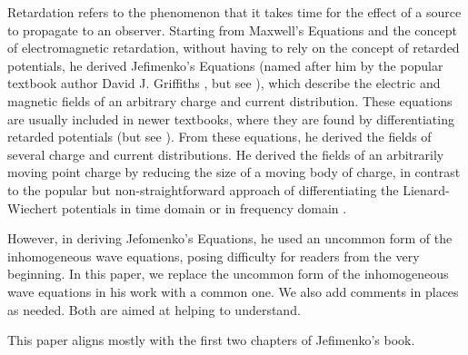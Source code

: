 \documentclass[11pt]{article}              %
\begin{document}
Retardation refers to the phenomenon that it takes time for the effect of a source to propagate to an observer. Starting from Maxwell's Equations and the concept of electromagnetic retardation, without having to rely on the concept of retarded potentials, he derived Jefimenko's Equations (named after him by the popular textbook author David J. Griffiths \cite{griffiths1999introduction}  \cite{heald1995classical}, but see \cite{panofsky1962classical} \cite{mcdonald1997relation} \cite{zangwill2013modern} ), which describe the electric and magnetic fields of an arbitrary charge and current distribution. These equations are usually included in newer textbooks, where they are found by differentiating retarded potentials \cite{lorrain1988electromagnetic} \cite{jackson1998classical} \cite{griffiths1999introduction}  \cite{zangwill2013modern} (but see \cite{page1922introduction} \cite{brau2004modern}). From these equations, he derived the fields of several charge and current distributions. He derived the fields of an arbitrarily moving point charge by reducing the size of a moving body of charge, in contrast to the popular but non-straightforward approach of differentiating the Lienard-Wiechert potentials in time domain \cite{panofsky1962classical} \cite{matveyev1966principles} \cite{landau1971classical} \cite{schwartz1972principles} \cite{reitz1979foundations} \cite{barut1980electrodynamics} \cite{becker1982electromagnetic} \cite{jackson1998classical} \cite{griffiths1999introduction} \cite{melia2001electrodynamics}  \cite{puri2011classical}  \cite{franklin2017classical}  \cite{davidson2019introduction} \cite{keohane2019introduction} or in frequency domain \cite{podolsky1969fundamentals}.

However, in deriving Jefomenko's Equations, he used an uncommon form of the inhomogeneous wave equations, posing difficulty for readers from the very beginning. In this paper, we replace the uncommon form of the inhomogeneous wave equations in his work with a common one. We also add comments in places as needed. Both are aimed at helping to understand.

This paper aligns mostly with the first two chapters of Jefimenko's book. 


\end{document}

